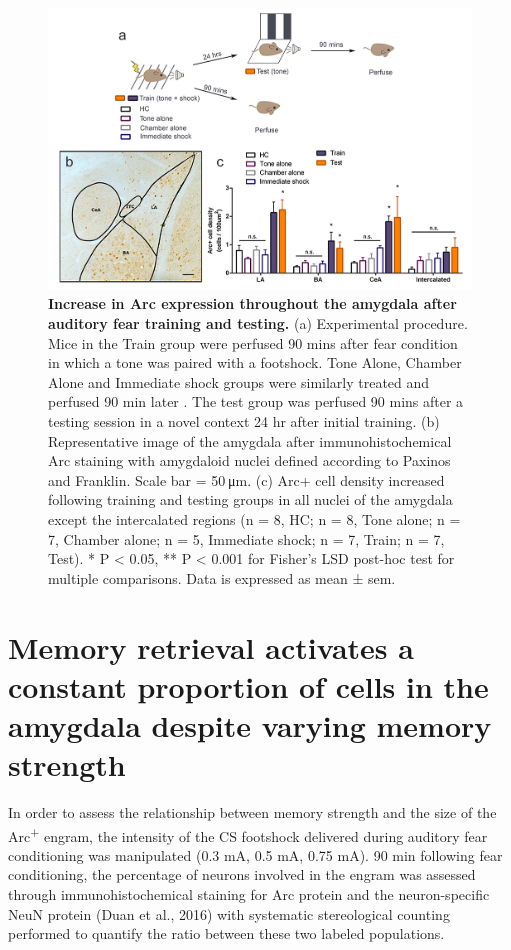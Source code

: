 \documentclass[12pt,a4paperpaper,]{report}
\begin{document}
\begin{figure}[htbp]
\centering
\includegraphics{source/figures/figure_1.jpg}
\caption{\textbf{Increase in Arc expression throughout the amygdala
after auditory fear training and testing.} (a) Experimental procedure.
Mice in the Train group were perfused 90 mins after fear condition in
which a tone was paired with a footshock. Tone Alone, Chamber Alone and
Immediate shock groups were similarly treated and perfused 90 min later
. The test group was perfused 90 mins after a testing session in a novel
context 24 hr after initial training. (b) Representative image of the
amygdala after immunohistochemical Arc staining with amygdaloid nuclei
defined according to Paxinos and Franklin. Scale bar = 50 μm. (c) Arc+
cell density increased following training and testing groups in all
nuclei of the amygdala except the intercalated regions (n = 8, HC; n =
8, Tone alone; n = 7, Chamber alone; n = 5, Immediate shock; n = 7,
Train; n = 7, Test). * P \textless{} 0.05, ** P \textless{} 0.001 for
Fisher's LSD post-hoc test for multiple comparisons. Data is expressed
as mean ± sem. \label{ref_a_figure}}
\end{figure}

\section{Memory retrieval activates a constant proportion of cells in
the amygdala despite varying memory
strength}\label{memory-retrieval-activates-a-constant-proportion-of-cells-in-the-amygdala-despite-varying-memory-strength}

In order to assess the relationship between memory strength and the size
of the Arc\textsuperscript{+} engram, the intensity of the CS footshock
delivered during auditory fear conditioning was manipulated (0.3 mA, 0.5
mA, 0.75 mA). 90 min following fear conditioning, the percentage of
neurons involved in the engram was assessed through immunohistochemical
staining for Arc protein and the neuron-specific NeuN protein (Duan et
al., 2016) with systematic stereological counting performed to quantify
the ratio between these two labeled populations.
\end{document}
